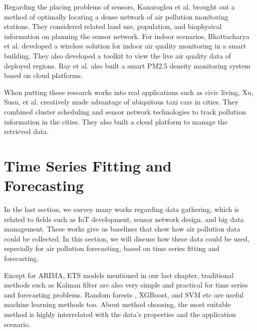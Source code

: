 Regarding the placing problems of sensors, Kanaroglou \cite{KANAROGLOU20052399} et al. brought out a method of optimally locating a dense network of air pollution monitoring stations. They considered related land use, population, and biophysical information on planning the sensor network. For indoor scenarios, Bhattacharya \cite{bhattacharya2012indoor} et al. developed a wireless solution for indoor air quality monitoring in a smart building. They also developed a toolkit to view the live air quality data of deployed regions. Ray et al. \cite{ray2016internet} also built a smart PM2.5 density monitoring system based on cloud platforms.

When putting these research works into real applications such as civic living, Xu, Susu, et al. \cite{xu2019ilocus} creatively made advantage of ubiquitous taxi cars in cities. They combined cluster scheduling and sensor network technologies to track pollution information in the cities. They also built a cloud platform to manage the retrieved data.

\section{Time Series Fitting and Forecasting}

In the last section, we survey many works regarding data gathering, which is related to fields such as IoT development, sensor network design, and big data management. These works give us baselines that show how air pollution data could be collected. In this section, we will discuss how these data could be used, especially for air pollution forecasting, based on time series fitting and forecasting.

Except for ARIMA, ETS models mentioned in our last chapter, traditional methods such as Kalman filter \cite{gomez1994estimation} are also very simple and practical for time series and forecasting problems. Random forests \cite{rouet2017machine}, XGBoost, and SVM \cite{sapankevych2009time} etc are useful machine learning methods too. About method choosing, the most suitable method is highly interrelated with the data's properties and the application scenario. 

